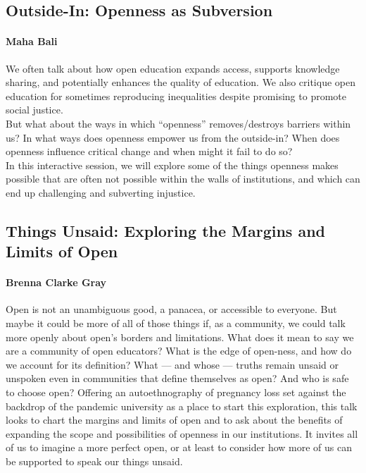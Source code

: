 \documentclass[
]{book}
\begin{document}
\begin{reflect}
\hypertarget{outside-in-openness-as-subversion}{%
\subsection{Outside-In: Openness as
Subversion}\label{outside-in-openness-as-subversion}}

\hypertarget{maha-bali}{%
\paragraph{Maha Bali}\label{maha-bali}}

We often talk about how open education expands access, supports
knowledge sharing, and potentially enhances the quality of education. We
also critique open education for sometimes reproducing inequalities
despite promising to promote social justice.\\
But what about the ways in which ``openness'' removes/destroys barriers
within us? In what ways does openness empower us from the outside-in?
When does openness influence critical change and when might it fail to
do so?\\
In this interactive session, we will explore some of the things openness
makes possible that are often not possible within the walls of
institutions, and which can end up challenging and subverting injustice.
\end{reflect}

\begin{reflect}
\hypertarget{things-unsaid-exploring-the-margins-and-limits-of-open}{%
\subsection{Things Unsaid: Exploring the Margins and Limits of
Open}\label{things-unsaid-exploring-the-margins-and-limits-of-open}}

\hypertarget{brenna-clarke-gray}{%
\paragraph{Brenna Clarke Gray}\label{brenna-clarke-gray}}

Open is not an unambiguous good, a panacea, or accessible to everyone.
But maybe it could be more of all of those things if, as a community, we
could talk more openly about open's borders and limitations. What does
it mean to say we are a community of open educators? What is the edge of
open-ness, and how do we account for its definition? What --- and whose
--- truths remain unsaid or unspoken even in communities that define
themselves as open? And who is safe to choose open? Offering an
autoethnography of pregnancy loss set against the backdrop of the
pandemic university as a place to start this exploration, this talk
looks to chart the margins and limits of open and to ask about the
benefits of expanding the scope and possibilities of openness in our
institutions. It invites all of us to imagine a more perfect open, or at
least to consider how more of us can be supported to speak our things
unsaid.
\end{reflect}
\end{document}
